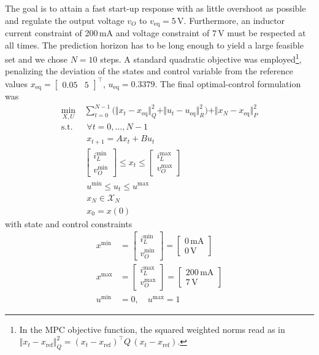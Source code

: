 The goal is to attain a fast start-up response with as little overshoot as possible and regulate the output voltage $v_O$ to $v_{\text{eq}}=5\,$V. Furthermore, an inductor current constraint of 200$\,$mA and voltage constraint of $7\,$V must be respected at all times. The prediction horizon has to be long enough to yield a large feasible set \cite{rawlings2017model} and we chose $N = 10$ steps. A standard quadratic objective was employed\footnote{In the MPC objective function, the squared weighted norms read as in $\Vert x_t - x_{\text{ref}} \Vert_Q^2 = (x_t - x_{\text{ref}})^\top Q \, (x_t - x_{\text{ref}})$.}, penalizing the deviation of the states and control variable from the reference values $x_{\text{eq}} = \begin{bmatrix} 0.05 & 5 \end{bmatrix}^\top$, $u_{\text{eq}} = 0.3379$. The final optimal-control formulation was
%
\begin{subequations}
	\label{eq:mpcFormulation}
	\begin{align}
		\min_{X,U} \ & \sum_{t=0}^{N-1} \big( \Vert x_t - x_{\text{eq}} \Vert_Q^2 + \Vert u_t - u_{\text{eq}} \Vert_R^2 \big) + \Vert x_N - x_{\text{eq}} \Vert_P^2 \\
		\text{s.t.} \ & \; \forall t = 0,\dots,N-1 \nonumber \\
		& \; x_{t+1} = A x_{t} + B u_{t} \\
		& \begin{bmatrix} i_L^{\text{min}} \\ v_O^{\text{min}}\end{bmatrix}
		\leq x_{t} \leq 
		\begin{bmatrix} i_L^{\text{max}} \\ v_O^{\text{max}}\end{bmatrix} \\
		& \; u^{\text{min}} \leq u_{t} \leq u^{\text{max}} \\
		& \; x_{N} \in \mathcal{X}_N \\
		& \; x_0 = x(0)
	\end{align}
\end{subequations}
with state and control constraints
\begin{align}
	x^{\text{min}} &= 
	\begin{bmatrix} i_L^{\text{min}} \\ v_O^{\text{min}}\end{bmatrix} = 
	\begin{bmatrix} 0 \, \text{mA} \\ 0 \, \text{V}\end{bmatrix} \\[3pt]
	x^{\text{max}} &= 
	\begin{bmatrix} i_L^{\text{max}} \\ v_O^{\text{max}}\end{bmatrix} = 
	\begin{bmatrix} 200 \, \text{mA} \\ 7 \, \text{V}\end{bmatrix} \\[3pt]
	u^{\text{min}} &= 0, \quad u^{\text{max}} = 1 
\end{align}
